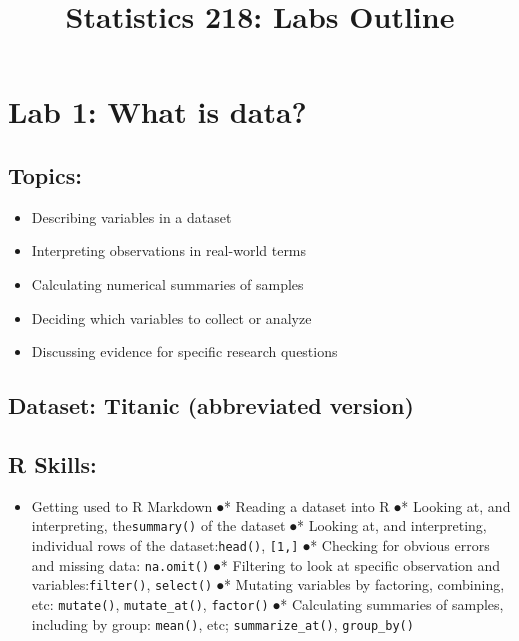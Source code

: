 \documentclass[]{article}
\title{Statistics 218: Labs Outline}
\author{}
\date{}
\providecommand{\tightlist}{%
  \setlength{\itemsep}{0pt}\setlength{\parskip}{0pt}}
\begin{document}
\maketitle

\section{Lab 1: What is data?}\label{lab-1-what-is-data}

\subsection{Topics:}\label{topics}

\begin{itemize}
\tightlist
\item
  Describing variables in a dataset
\item
  Interpreting observations in real-world terms
\item
  Calculating numerical summaries of samples
\item
  Deciding which variables to collect or analyze
\item
  Discussing evidence for specific research questions
\end{itemize}

\subsection{Dataset: Titanic (abbreviated
version)}\label{dataset-titanic-abbreviated-version}

\subsection{R Skills:}\label{r-skills}

\begin{itemize}
\tightlist
\item
  Getting used to R Markdown ⦁* Reading a dataset into R ⦁* Looking at,
  and interpreting, the\texttt{summary()} of the dataset ⦁* Looking at,
  and interpreting, individual rows of the dataset:\texttt{head()},
  \texttt{{[}1,{]}} ⦁* Checking for obvious errors and missing data:
  \texttt{na.omit()} ⦁* Filtering to look at specific observation and
  variables:\texttt{filter()}, \texttt{select()} ⦁* Mutating variables
  by factoring, combining, etc: \texttt{mutate()},
  \texttt{mutate\_at()}, \texttt{factor()} ⦁* Calculating summaries of
  samples, including by group: \texttt{mean()}, etc;
  \texttt{summarize\_at()}, \texttt{group\_by()}
\end{itemize}
\end{document}
